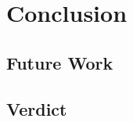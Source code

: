 %
\chapter{Conclusion}
\label{chap:conclusion}

\section{Future Work}
\label{sec:conclusion:future-work}

\section{Verdict}
\label{sec:conclusion:verdict}
